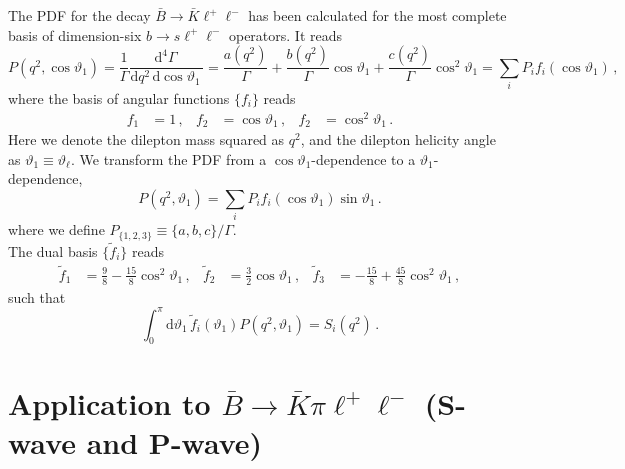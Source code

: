 \documentclass[aps,prd,reprint,nofootinbib,preprintnumbers]{revtex4}
\newcommand{\dual}[1]{\tilde{#1}}
\newcommand{\rmdx}[1]{\mbox{d} #1 \,} %
\renewcommand{\theta}{\vartheta}
\begin{document}
The PDF for the decay $\bar{B}\to\bar{K}\ell^+\ell^-$ has been calculated for the most
complete basis of dimension-six $b\to s \ell^+\ell^-$ operators. It reads \cite{Bobeth:2007dw,Bobeth:2012vn}
\begin{equation}
    P(q^2, \cos\theta_1) = \frac{1}{\Gamma} \frac{\rmdx{^4\Gamma}}{\rmdx{q^2} \rmdx{\cos\theta_1}} = \frac{a(q^2)}{\Gamma} + \frac{b(q^2)}{\Gamma} \cos\theta_1 + \frac{c(q^2)}{\Gamma} \cos^2\theta_1 = \sum_i P_i f_i(\cos\theta_1)\,,
\end{equation}
where the basis of angular functions $\lbrace f_i\rbrace$ reads
\begin{equation}
\begin{aligned}
    f_1 & = 1\,, &
    f_2 & = \cos\theta_1\,, &
    f_2 & = \cos^2\theta_1\,.
\end{aligned}
\end{equation}
Here we denote the dilepton mass squared as $q^2$, and the dilepton helicity angle as $\theta_1 \equiv \theta_{\ell}$. We transform the PDF from a $\cos\theta_1$-dependence
to a $\theta_1$-dependence,
\begin{equation}
    P(q^2, \theta_1) = \sum_i P_i f_i(\cos\theta_1) \sin \theta_1\,.
\end{equation}
where we define $P_{\lbrace 1,2,3\rbrace} \equiv \lbrace a, b, c\rbrace / \Gamma$.\\

The dual basis $\lbrace \dual{f}_i\rbrace$ reads
\begin{equation}
\begin{aligned}
    \dual{f}_1 & = \frac{9}{8} - \frac{15}{8}\cos^2\theta_1\,, &
    \dual{f}_2 & = \frac{3}{2}\cos\theta_1\,, &
    \dual{f}_3 & = -\frac{15}{8} + \frac{45}{8}\cos^2\theta_1\,,
\end{aligned}
\end{equation}
such that
\begin{equation}
    \int_0^\pi \rmdx{\theta_1} \dual{f}_i(\theta_1) P(q^2, \theta_1) = S_i(q^2)\,.
\end{equation}

\section{Application to $\bar{B}\to\bar{K}\pi\ell^+\ell^-$ (S-wave and P-wave)}
\label{app:btokstarll}
\end{document}
